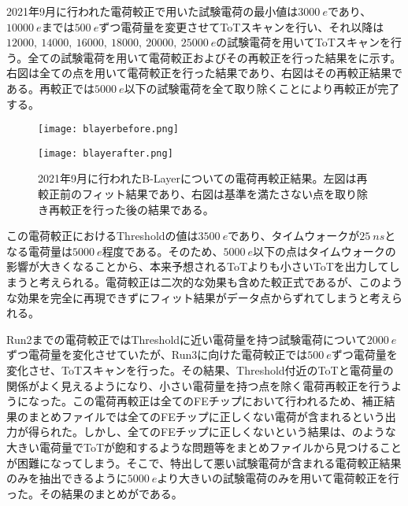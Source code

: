 2021年9月に行われた電荷較正で用いた試験電荷の最小値は$3000\ \si{e}$であり、$10000\ \si{e}$までは$500\ \si{e}$ずつ電荷量を変更させてToTスキャンを行い、それ以降は$12000,\ 14000,\ 16000,\ 18000,\ 20000,\ 25000\ \si{e}$の試験電荷を用いてToTスキャンを行う。全ての試験電荷を用いて電荷較正およびその再較正を行った結果をに示す。右図は全ての点を用いて電荷較正を行った結果であり、右図はその再較正結果である。再較正では$5000\ \si{e}$以下の試験電荷を全て取り除くことにより再較正が完了する。

\begin{figure}[tbp]
  \begin{minipage}[b]{0.5\linewidth}
    \centering
    \texttt{[image: blayerbefore.png]}
  \end{minipage}
  \begin{minipage}[b]{0.5\linewidth}
    \centering
    \texttt{[image: blayerafter.png]}
  \end{minipage}
  \caption[2021年9月に行われたB-Layerについての電荷較正結果]{2021年9月に行われたB-Layerについての電荷再較正結果。左図は再較正前のフィット結果であり、右図は基準を満たさない点を取り除き再較正を行った後の結果である。}
  \label{fig:blayerba}
\end{figure}

この電荷較正におけるThresholdの値は$3500\ \si{e}$であり、タイムウォークが$25\ \si{ns}$となる電荷量は$5000\ \si{e}$程度である。そのため、$5000\ \si{e}$以下の点はタイムウォークの影響が大きくなることから、本来予想されるToTよりも小さいToTを出力してしまうと考えられる。電荷較正は二次的な効果も含めた較正式であるが、このような効果を完全に再現できずにフィット結果がデータ点からずれてしまうと考えられる。

Run2までの電荷較正ではThresholdに近い電荷量を持つ試験電荷について$2000\ \si{e}$ずつ電荷量を変化させていたが、Run3に向けた電荷較正では$500\ \si{e}$ずつ電荷量を変化させ、ToTスキャンを行った。その結果、Threshold付近のToTと電荷量の関係がよく見えるようになり、小さい電荷量を持つ点を除く電荷再較正を行うようになった。この電荷再較正は全てのFEチップにおいて行われるため、補正結果のまとめファイルでは全てのFEチップに正しくない電荷が含まれるという出力が得られた。しかし、全てのFEチップに正しくないという結果は、のような大きい電荷量でToTが飽和するような問題等をまとめファイルから見つけることが困難になってしまう。そこで、特出して悪い試験電荷が含まれる電荷較正結果のみを抽出できるように$5000\ \si{e}$より大きいの試験電荷のみを用いて電荷較正を行った。その結果のまとめがである。

